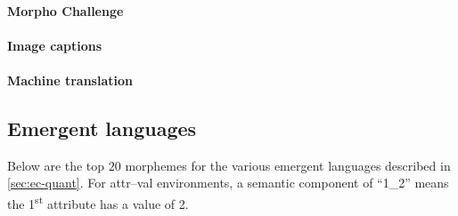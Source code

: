 \paragraph{Morpho Challenge}

\paragraph{Image captions}

\paragraph{Machine translation}


\subsection{Emergent languages}%
\label{app:ec-inv}

Below are the top $20$ morphemes for the various emergent languages described in \cref{sec:ec-quant}.
For attr--val environments, a semantic component of ``1\_2'' means the 1\textsuperscript{st} attribute has a value of 2.


